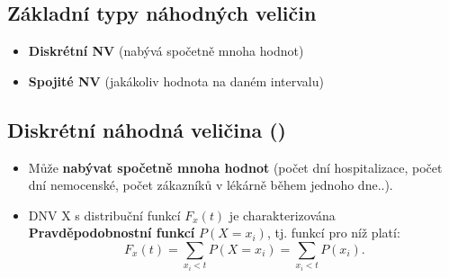 \subsection{Základní typy náhodných veličin}
\begin{itemize}
	\item \textbf{Diskrétní NV} (nabývá spočetně mnoha hodnot)
	\item \textbf{Spojité NV} (jakákoliv hodnota na daném intervalu)
\end{itemize}

\subsection{Diskrétní náhodná veličina ()}
\begin{itemize}
		\item Může \textbf{nabývat spočetně mnoha hodnot} (počet dní hospitalizace, počet dní nemocenské, počet zákazníků v lékárně během jednoho dne..).
		\item DNV X s distribuční funkcí $F_x(t)$ je charakterizována \textbf{Pravděpodobnostní funkcí} $P(X = x_i)$, tj. funkcí pro níž platí:
				\begin{equation*}
					F_x(t) = \sum_{x_i<t}P(X = x_i)= \sum_{x_i<t}P(x_i).
				\end{equation*}
\end{itemize}
